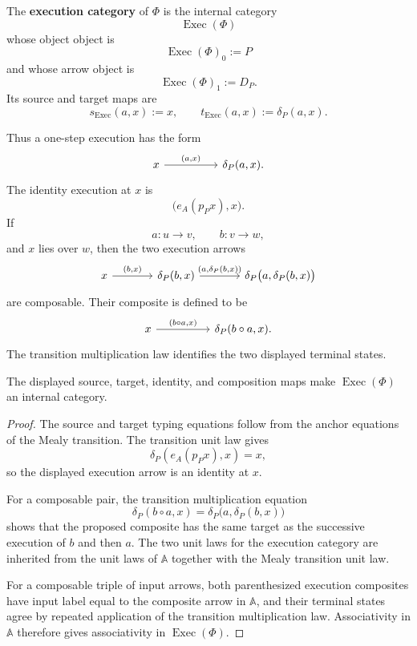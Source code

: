 \begin{definition}
\label{def:execution-category}
The \textbf{execution category} of \(\Phi\) is the internal category
\[
    \operatorname{Exec}(\Phi)
\]
whose object object is
\[
    \operatorname{Exec}(\Phi)_0:=P
\]
and whose arrow object is
\[
    \operatorname{Exec}(\Phi)_1:=D_P.
\]
Its source and target maps are
\[
    s_{\operatorname{Exec}}(a,x):=x,
    \qquad
    t_{\operatorname{Exec}}(a,x):=\delta_P(a,x).
\]
\end{definition}

Thus a one-step execution has the form
\[
\begin{tikzcd}[column sep=huge]
    x
        \arrow[r, "{(a,x)}"]
    &
    \delta_P(a,x).
\end{tikzcd}
\]
The identity execution at \(x\) is
\[
    \bigl(e_A(p_Px),x\bigr).
\]
If
\[
    a:u\to v,
    \qquad
    b:v\to w,
\]
and \(x\) lies over \(w\), then the two execution arrows
\[
\begin{tikzcd}[column sep=large]
    x
        \arrow[r, "{(b,x)}"]
    &
    \delta_P(b,x)
        \arrow[r, "{(a,\delta_P(b,x))}"]
    &
    \delta_P\bigl(a,\delta_P(b,x)\bigr)
\end{tikzcd}
\]
are composable. Their composite is defined to be
\[
\begin{tikzcd}[column sep=huge]
    x
        \arrow[r, "{(b\circ a,x)}"]
    &
    \delta_P(b\circ a,x).
\end{tikzcd}
\]
The transition multiplication law identifies the two displayed terminal
states.

\begin{proposition}
\label{prop:internal-category-structure-execution}
The displayed source, target, identity, and composition maps make
\(\operatorname{Exec}(\Phi)\) an internal category.
\end{proposition}

\begin{proof}
The source and target typing equations follow from the anchor equations of the
Mealy transition. The transition unit law gives
\[
    \delta_P(e_A(p_Px),x)=x,
\]
so the displayed execution arrow is an identity at \(x\).

For a composable pair, the transition multiplication equation
\[
    \delta_P(b\circ a,x)
    =
    \delta_P\bigl(a,\delta_P(b,x)\bigr)
\]
shows that the proposed composite has the same target as the successive
execution of \(b\) and then \(a\). The two unit laws for the execution
category are inherited from the unit laws of \(\mathbb A\) together with the
Mealy transition unit law.

For a composable triple of input arrows, both parenthesized execution
composites have input label equal to the composite arrow in \(\mathbb A\),
and their terminal states agree by repeated application of the transition
multiplication law. Associativity in \(\mathbb A\) therefore gives
associativity in \(\operatorname{Exec}(\Phi)\).
\end{proof}

